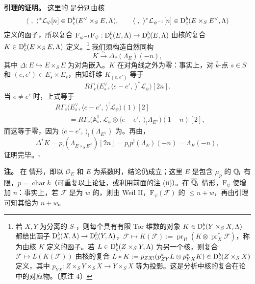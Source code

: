 \noindent\textbf{引理的证明。} 这里的 是分别由核
\[
\langle\ ,\ \rangle^*\mathcal L_\psi[n]\in\mathrm{D}_c^b(E^\vee\times_SE,\Lambda),
\qquad
\langle\ ,\ \rangle^*\mathcal L_{\psi^{-1}}[n]\in\mathrm{D}_c^b(E\times_SE^\vee,\Lambda)
\]
定义的函子，所以复合 $\mathrm F_{\psi^{-1}}\mathrm F_\psi:\mathrm{D}_c^b(E,\Lambda)\to\mathrm{D}_c^b(E,\Lambda)$ 由核的复合 $K\in\mathrm{D}_c^b(E\times_SE,\Lambda)$ 定义。\footnote{若 $X,Y$ 为分离的 $S$-，则每个具有有限 Tor 维数的对象 $K\in\mathrm{D}_c^b(Y\times_SX,\Lambda)$ 都给出函子 $\mathrm{D}_c^b(X,\Lambda)\to\mathrm{D}_c^b(Y,\Lambda)$，$\mathcal F\mapsto K(\mathcal F):=\operatorname{pr}_{Y!}(K\otimes\operatorname{pr}_X^*\mathcal F)$，称为由核 $K$ 定义的函子。若 $L\in\mathrm{D}_c^b(Z\times_SY,\Lambda)$ 为另一个核，则复合 $\mathcal F\mapsto L(K(\mathcal F))$ 由核的复合 $L*K:=p_{ZX!}(p_{ZY}^*L\otimes p_{YX}^*K)\in\mathrm{D}_c^b(Z\times_SX)$ 定义，其中 $p_{YX}:Z\times_SY\times_SX\to Y\times_SX$ 等为投影。这是分析中核的复合在论中的对应物。〔原注 4〕} 我们须构造自然同构
\[
K\xrightarrow{\sim}\Delta_*(\Lambda_E)(-n),
\]
其中 $\Delta:E\hookrightarrow E\times_SE$ 为对角嵌入。$K$ 在对角线之外为零：事实上，对 $\bar k$-点 $s\in S$ 和 $(e,e')\in E_s\times E_s$，由知纤维 $K_{(e,e')}$ 等于
\[
R\Gamma_c\bigl(E_s^\vee,\langle e-e',\ \rangle^*\mathcal L_\psi\bigr)[2n].
\]
当 $e\ne e'$ 时，上式等于
\begin{align*}
&R\Gamma_c\bigl(E_s^\vee,\langle e-e',\ \rangle^!\mathcal L_\psi\bigr)(1)[2]\\
&\qquad=R\Gamma_c\bigl(\mathbb A_s^1,\mathcal L_\psi\otimes\langle e-e',\ \rangle_!\Lambda_{E^\vee}\bigr)(1-n)[2],
\end{align*}
而这等于零，因为 $\langle e-e',\ \rangle_!(\Lambda_{E^\vee})$ 为。再由，
\[
\Delta^*K=p_!(\Lambda_{E\times_SE^\vee})[2n]
=p_!p^!(\Lambda_E)(-n)=\Lambda_E(-n),
\]
证明完毕。\hfill$\square$

\par\medskip\noindent\textbf{注。} 在 情形，即以 $\mathcal O_E$ 和 $E$ 为系数时，结论仍成立；这里 $E$ 是包含 $\mu_p$ 的 $\mathbb Q_l$ 有限，$p=\operatorname{char}k$（可重复以上论证，或利用前面的注 (ii)）。在 $\overline{\mathbb Q}_l$ 情形，$\mathrm F_\psi$ 使增加 $n$：事实上，若 $\mathcal F$ 是为 $w$ 的，则由 Weil II，$\mathrm F_\psi(\mathcal F)$ 的 $\le n+w$，再由引理可知其恰为 $n+w$。
